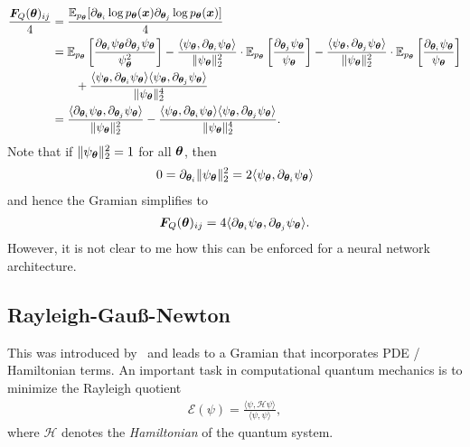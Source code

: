 \begin{align*}
    \frac{{\bm{F}}_Q({\bm{\theta}})_{ij}}{4} & = \frac{\mathbb E_{p_{\bm{\theta}}}[\partial_{{\bm{\theta}}_i} \log p_{{\bm{\theta}}}({\bm{x}})\partial_{{\bm{\theta}}_j} \log p_{{\bm{\theta}}}({\bm{x}})]}{4} 
    \\ & = \mathbb E_{p_{\bm{\theta}}}\left[ \frac{\partial_{{\bm{\theta}}_i} \psi_{\bm{\theta}} \partial_{{\bm{\theta}}_j} \psi_{\bm{\theta}}}{\psi_{\bm{\theta}}^2} \right] - \frac{\langle \psi_{{\bm{\theta}}}, \partial_{{\bm{\theta}}_i} \psi_{\bm{\theta}} \rangle}{ \lVert \psi_{\bm{\theta}} \rVert_2^2 } \cdot \mathbb E_{p_{\bm{\theta}}} \left[ \frac{\partial_{{\bm{\theta}}_j} \psi_{\bm{\theta}}}{\psi_{\bm{\theta}}} \right] - \frac{\langle \psi_{{\bm{\theta}}}, \partial_{{\bm{\theta}}_j} \psi_{\bm{\theta}} \rangle}{ \lVert \psi_{\bm{\theta}} \rVert_2^2 } \cdot \mathbb E_{p_{\bm{\theta}}} \left[ \frac{\partial_{{\bm{\theta}}_i} \psi_{\bm{\theta}}}{\psi_{\bm{\theta}}} \right] 
    \\ & \qquad + \frac{\langle \psi_{{\bm{\theta}}}, \partial_{{\bm{\theta}}_i} \psi_{\bm{\theta}} \rangle\langle \psi_{{\bm{\theta}}}, \partial_{{\bm{\theta}}_j} \psi_{\bm{\theta}} \rangle}{\lVert \psi_{\bm{\theta}} \rVert_2^4}
    \\ & = \frac{\langle \partial_{{\bm{\theta}}_i} \psi_{{\bm{\theta}}}, \partial_{{\bm{\theta}}_j} \psi_{\bm{\theta}} \rangle}{\lVert \psi_{\bm{\theta}} \rVert_2^2} - \frac{\langle \psi_{{\bm{\theta}}}, \partial_{{\bm{\theta}}_i} \psi_{\bm{\theta}} \rangle\langle \psi_{{\bm{\theta}}}, \partial_{{\bm{\theta}}_j} \psi_{\bm{\theta}} \rangle}{\lVert \psi_{\bm{\theta}} \rVert_2^4}. 
\end{align*}
Note that if $\lVert \psi_{\bm{\theta}} \rVert_2^2=1$ for all ${\bm{\theta}}$, then 
\begin{align}
    0 = \partial_{{\bm{\theta}}_i} \lVert \psi_{\bm{\theta}} \rVert_2^2 = 2\langle \psi_{{\bm{\theta}}}, \partial_{{\bm{\theta}}_i} \psi_{\bm{\theta}} \rangle
\end{align}
and hence the Gramian simplifies to 
\begin{align}
{\bm{F}}_Q({\bm{\theta}})_{ij} = 4\langle \partial_{{\bm{\theta}}_i} \psi_{{\bm{\theta}}}, \partial_{{\bm{\theta}}_j} \psi_{\bm{\theta}} \rangle. 
\end{align}
However, it is not clear to me how this can be enforced for a neural network architecture. 

\subsection{Rayleigh-Gauß-Newton}
This was introduced by~\cite{webber2022rayleigh} and leads to a Gramian that incorporates PDE / Hamiltonian terms. 
An important task in computational quantum mechanics is to minimize the Rayleigh quotient 
\begin{align}
    \mathcal E(\psi) = \frac{\langle \psi, \mathcal H \psi \rangle}{\langle \psi, \psi \rangle},
\end{align}
where $\mathcal H$ denotes the \emph{Hamiltonian} of the quantum system. 



